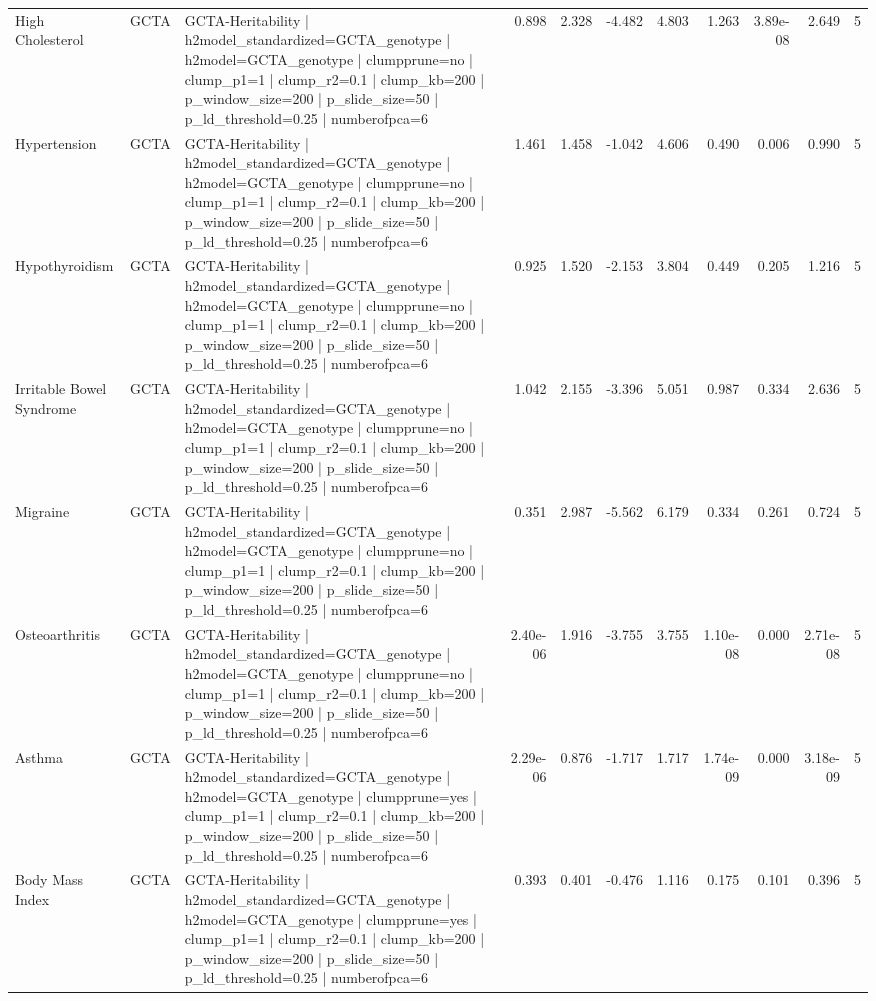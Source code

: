 \begin{landscape}
\begin{longtable}{p{2.4cm}p{1.8cm}p{6.0cm}rrrrrrrr}
High Cholesterol & GCTA & GCTA-Heritability | h2model\_standardized=GCTA\_genotype | h2model=GCTA\_genotype | clumpprune=no | clump\_p1=1 | clump\_r2=0.1 | clump\_kb=200 | p\_window\_size=200 | p\_slide\_size=50 | p\_ld\_threshold=0.25 | numberofpca=6 & 0.898 & 2.328 & -4.482 & 4.803 & 1.263 & 3.89e-08 & 2.649 & 5 \\
Hypertension & GCTA & GCTA-Heritability | h2model\_standardized=GCTA\_genotype | h2model=GCTA\_genotype | clumpprune=no | clump\_p1=1 | clump\_r2=0.1 | clump\_kb=200 | p\_window\_size=200 | p\_slide\_size=50 | p\_ld\_threshold=0.25 | numberofpca=6 & 1.461 & 1.458 & -1.042 & 4.606 & 0.490 & 0.006 & 0.990 & 5 \\
Hypothyroidism & GCTA & GCTA-Heritability | h2model\_standardized=GCTA\_genotype | h2model=GCTA\_genotype | clumpprune=no | clump\_p1=1 | clump\_r2=0.1 | clump\_kb=200 | p\_window\_size=200 | p\_slide\_size=50 | p\_ld\_threshold=0.25 | numberofpca=6 & 0.925 & 1.520 & -2.153 & 3.804 & 0.449 & 0.205 & 1.216 & 5 \\
Irritable Bowel Syndrome & GCTA & GCTA-Heritability | h2model\_standardized=GCTA\_genotype | h2model=GCTA\_genotype | clumpprune=no | clump\_p1=1 | clump\_r2=0.1 | clump\_kb=200 | p\_window\_size=200 | p\_slide\_size=50 | p\_ld\_threshold=0.25 | numberofpca=6 & 1.042 & 2.155 & -3.396 & 5.051 & 0.987 & 0.334 & 2.636 & 5 \\
Migraine & GCTA & GCTA-Heritability | h2model\_standardized=GCTA\_genotype | h2model=GCTA\_genotype | clumpprune=no | clump\_p1=1 | clump\_r2=0.1 | clump\_kb=200 | p\_window\_size=200 | p\_slide\_size=50 | p\_ld\_threshold=0.25 | numberofpca=6 & 0.351 & 2.987 & -5.562 & 6.179 & 0.334 & 0.261 & 0.724 & 5 \\
Osteoarthritis & GCTA & GCTA-Heritability | h2model\_standardized=GCTA\_genotype | h2model=GCTA\_genotype | clumpprune=no | clump\_p1=1 | clump\_r2=0.1 | clump\_kb=200 | p\_window\_size=200 | p\_slide\_size=50 | p\_ld\_threshold=0.25 | numberofpca=6 & 2.40e-06 & 1.916 & -3.755 & 3.755 & 1.10e-08 & 0.000 & 2.71e-08 & 5 \\
Asthma & GCTA & GCTA-Heritability | h2model\_standardized=GCTA\_genotype | h2model=GCTA\_genotype | clumpprune=yes | clump\_p1=1 | clump\_r2=0.1 | clump\_kb=200 | p\_window\_size=200 | p\_slide\_size=50 | p\_ld\_threshold=0.25 | numberofpca=6 & 2.29e-06 & 0.876 & -1.717 & 1.717 & 1.74e-09 & 0.000 & 3.18e-09 & 5 \\
Body Mass Index & GCTA & GCTA-Heritability | h2model\_standardized=GCTA\_genotype | h2model=GCTA\_genotype | clumpprune=yes | clump\_p1=1 | clump\_r2=0.1 | clump\_kb=200 | p\_window\_size=200 | p\_slide\_size=50 | p\_ld\_threshold=0.25 | numberofpca=6 & 0.393 & 0.401 & -0.476 & 1.116 & 0.175 & 0.101 & 0.396 & 5 \\

\end{longtable}
\end{landscape}
